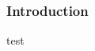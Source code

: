 \documentclass[unknownkeysallowed]{beamer}
\begin{document}
\begin{frame}
\frametitle{Introduction}
test
\end{frame}
\end{document}
